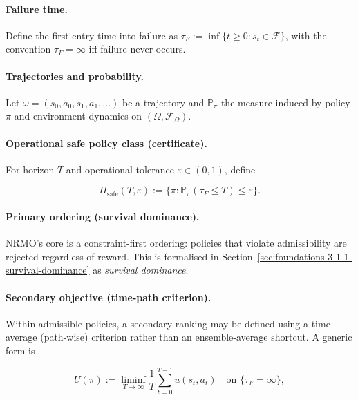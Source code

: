 \paragraph{Failure time.}
Define the first-entry time into failure as
$\tau_F := \inf\{t \ge 0 : s_t \in \mathcal{F}\}$, with the
convention $\tau_F = \infty$ iff failure never occurs.

\paragraph{Trajectories and probability.}
Let $\omega = (s_0, a_0, s_1, a_1, \ldots)$ be a trajectory and
$\mathbb{P}_\pi$ the measure induced by policy $\pi$ and environment
dynamics on $(\Omega, \mathcal{F}_\Omega)$.

\paragraph{Operational safe policy class (certificate).}
For horizon $T$ and operational tolerance $\varepsilon \in (0, 1)$,
define

\begin{equation}
\Pi_{\mathrm{safe}}(T, \varepsilon) := \bigl\{\pi : \mathbb{P}_\pi(\tau_F \le T) \le \varepsilon\bigr\}.
\label{eq:foundations-pi-safe}
\end{equation}

\paragraph{Primary ordering (survival dominance).}
NRMO's core is a constraint-first ordering: policies that violate
admissibility are rejected regardless of reward. This is formalised
in Section~\ref{sec:foundations-3-1-1-survival-dominance} as
\emph{survival dominance}.

\paragraph{Secondary objective (time-path criterion).}
Within admissible policies, a secondary ranking may be defined using
a time-average (path-wise) criterion rather than an
ensemble-average shortcut. A generic form is

\begin{equation}
U(\pi) := \liminf_{T \to \infty} \frac{1}{T}
\sum_{t=0}^{T-1} u(s_t, a_t)
\quad \text{on } \{\tau_F = \infty\},
\label{eq:foundations-time-average-utility}
\end{equation}

